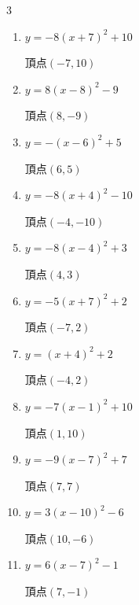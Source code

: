 \begin{multicols}{3}
\begin{enumerate}
        $\displaystyle 頂点\left( -9 , 6 \right)$

  \item $\displaystyle y=-8\left( x+7\right)^{2}+10$

        $\displaystyle 頂点\left( -7 , 10 \right)$

  \item $\displaystyle y=8\left( x-8\right)^{2}-9$

        $\displaystyle 頂点\left( 8 , -9 \right)$

  \item $\displaystyle y=-\left( x-6\right)^{2}+5$

        $\displaystyle 頂点\left( 6 , 5 \right)$

  \item $\displaystyle y=-8\left( x+4\right)^{2}-10$

        $\displaystyle 頂点\left( -4 , -10 \right)$

  \item $\displaystyle y=-8\left( x-4\right)^{2}+3$

        $\displaystyle 頂点\left( 4 , 3 \right)$

  \item $\displaystyle y=-5\left( x+7\right)^{2}+2$

        $\displaystyle 頂点\left( -7 , 2 \right)$

\columnbreak %

\resetques

  \item $\displaystyle y=\left( x+4\right)^{2}+2$

        $\displaystyle 頂点\left( -4 , 2 \right)$

  \item $\displaystyle y=-7\left( x-1\right)^{2}+10$

        $\displaystyle 頂点\left( 1 , 10 \right)$

  \item $\displaystyle y=-9\left( x-7\right)^{2}+7$

        $\displaystyle 頂点\left( 7 , 7 \right)$

  \item $\displaystyle y=3\left( x-10\right)^{2}-6$

        $\displaystyle 頂点\left( 10 , -6 \right)$

  \item $\displaystyle y=6\left( x-7\right)^{2}-1$

        $\displaystyle 頂点\left( 7 , -1 \right)$


\end{enumerate}
\end{multicols}
